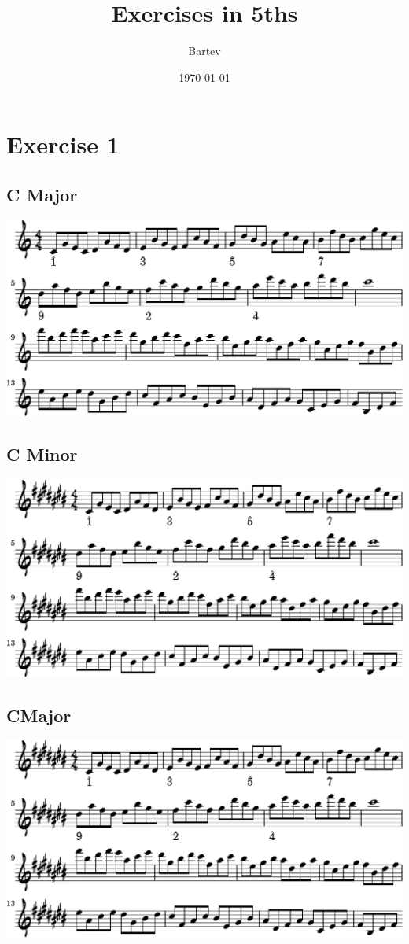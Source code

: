 \documentclass[11pt]{article}
\author{Bartev}
\date{\today}
\title{Exercises in 5ths}
\let\maketitle\relax %
\begin{document}
\maketitle

\section*{Exercise 1}
\label{sec:org5ba8e22}
\subsection*{C Major}
\label{sec:org9452b00}

\begin{center}
\includegraphics[width=.9\linewidth]{e1_c_maj.pdf}
\end{center}

\subsection*{C Minor}
\label{sec:org7e4bdc4}

\begin{center}
\includegraphics[width=.9\linewidth]{e-flat.pdf}
\end{center}

\subsection*{C\sharp    Major}
\label{sec:orgda662f2}

\begin{center}
\includegraphics[width=.9\linewidth]{e-flat.pdf}
\end{center}
\end{document}
